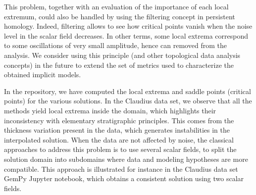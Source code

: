 \documentclass[preprint]{ring20}
\begin{document}
{This problem, together with an evaluation of the importance of each local extremum, could also be handled by using the filtering concept in persistent homology. Indeed, filtering allows to see how critical points vanish when the noise level in the scalar field decreases. In other terms, some local extrema correspond to some oscillations of very small amplitude, hence can removed from the analysis. We consider using this principle (and other topological data analysis concepts) in the future to extend the set of metrics used to characterize the obtained implicit models. 

In the repository, we have computed the local extrema and saddle points (critical points) for the various solutions. In the Claudius data set, we observe that all the methods yield local extrema inside the domain, which highlights their inconsistency with elementary stratigraphic principles. This comes from the thickness variation present in the data, which generates instabilities in the interpolated solution. When the data are not affected by noise, the classical approaches to address this problem is to use several scalar fields, to split the solution domain into subdomains where data and modeling hypotheses are more compatible. This approach is illustrated for instance in the Claudius data set GemPy Jupyter notebook, which obtains a consistent solution using two scalar fields. 


 


}
\end{document}
